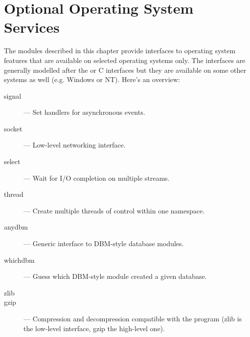 \chapter{Optional Operating System Services}

The modules described in this chapter provide interfaces to operating
system features that are available on selected operating systems only.
The interfaces are generally modelled after the \UNIX{} or C
interfaces but they are available on some other systems as well
(e.g. Windows or NT).  Here's an overview:

\begin{description}

\item[signal]
--- Set handlers for asynchronous events.

\item[socket]
--- Low-level networking interface.

\item[select]
--- Wait for I/O completion on multiple streams.

\item[thread]
--- Create multiple threads of control within one namespace.

\item[anydbm]
--- Generic interface to DBM-style database modules.

\item[whichdbm]
--- Guess which DBM-style module created a given database.

\item[zlib]
\item[gzip]
--- Compression and decompression compatible with the
 program (zlib is the low-level interface, gzip the
high-level one).

\end{description}
